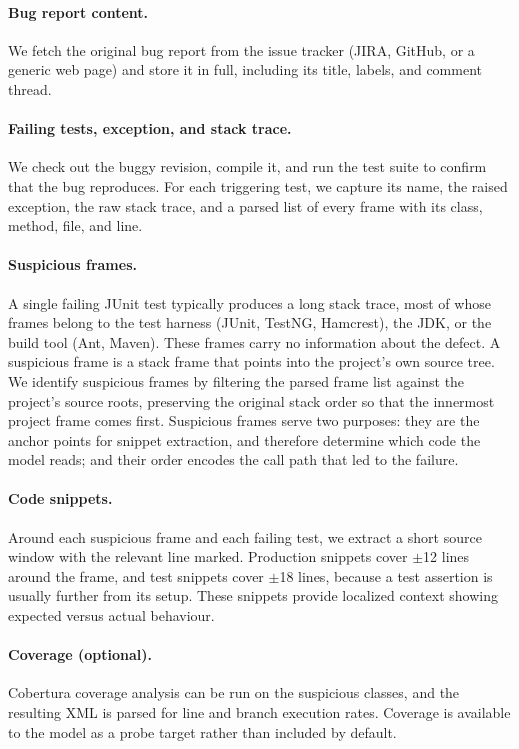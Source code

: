 \documentclass{iutbscthesis}
\begin{document}
\paragraph{Bug report content.} We fetch the original bug report from the issue tracker (JIRA, GitHub, or a generic web page) and store it in full, including its title, labels, and comment thread.

\paragraph{Failing tests, exception, and stack trace.} We check out the buggy revision, compile it, and run the test suite to confirm that the bug reproduces. For each triggering test, we capture its name, the raised exception, the raw stack trace, and a parsed list of every frame with its class, method, file, and line.

\paragraph{Suspicious frames.} A single failing JUnit test typically produces a long stack trace, most of whose frames belong to the test harness (JUnit, TestNG, Hamcrest), the JDK, or the build tool (Ant, Maven). These frames carry no information about the defect. A suspicious frame is a stack frame that points into the project's own source tree. We identify suspicious frames by filtering the parsed frame list against the project's source roots, preserving the original stack order so that the innermost project frame comes first. Suspicious frames serve two purposes: they are the anchor points for snippet extraction, and therefore determine which code the model reads; and their order encodes the call path that led to the failure.

\paragraph{Code snippets.} Around each suspicious frame and each failing test, we extract a short source window with the relevant line marked. Production snippets cover $\pm$12 lines around the frame, and test snippets cover $\pm$18 lines, because a test assertion is usually further from its setup. These snippets provide localized context showing expected versus actual behaviour.

\paragraph{Coverage (optional).} Cobertura coverage analysis can be run on the suspicious classes, and the resulting XML is parsed for line and branch execution rates. Coverage is available to the model as a probe target rather than included by default.
\end{document}
